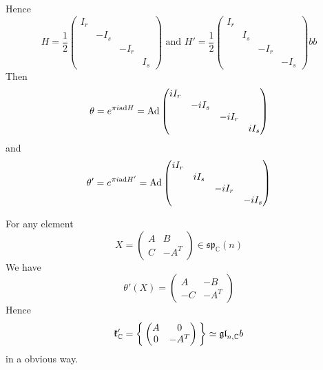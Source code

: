 \documentclass[12pt]{article}
\def\bC{{\mathbb{C}}}
\def\sp{{\mathfrak{sp}}}
\def\ad{{\rm ad}}
\def\Ad{{\rm Ad}}
\def\Ad{\mathrm{Ad}}
\def\agl{\mathfrak{gl}}
\def\fkk{\mathfrak{k}}
\begin{document}
Hence 
\[
H = \frac{1}{2} \begin{pmatrix}
I_r & & & \\
 & -I_s & & \\
 & & -I_r & \\
 & & & I_s 
\end{pmatrix}
\text{ and }
H' = \frac{1}{2} 
\begin{pmatrix}
I_r & & & \\
 & I_s & & \\
 & & -I_r & \\
 & & & -I_s 
\end{pmatrix}
bb\]
Then 
\[
\theta = e^{\pi i \ad H} =\Ad \begin{pmatrix}
iI_r & & & \\
 & -iI_s & & \\
 & & -iI_r & \\
 & & & iI_s 
\end{pmatrix}
\]
and
\[
\theta' = e^{\pi i \ad H'} = \Ad \begin{pmatrix}
iI_r & & & \\
 & iI_s & & \\
 & & -iI_r & \\
 & & & -iI_s 
\end{pmatrix}
\]

For any element 
\[ X = 
\begin{pmatrix}
A & B \\
C & -A^T 
\end{pmatrix} \in \sp_\bC(n)
\]
We have 
\[
\theta'(X) = \begin{pmatrix}
A & -B\\
-C & -A^T
\end{pmatrix}
\]
Hence 
\[
\fkk_\bC' = \Set{\begin{pmatrix}
A & 0 \\
0 & -A^T 
\end{pmatrix}} \simeq \agl_{n, \bC}  
b\]
in a obvious way. 
\end{document}
